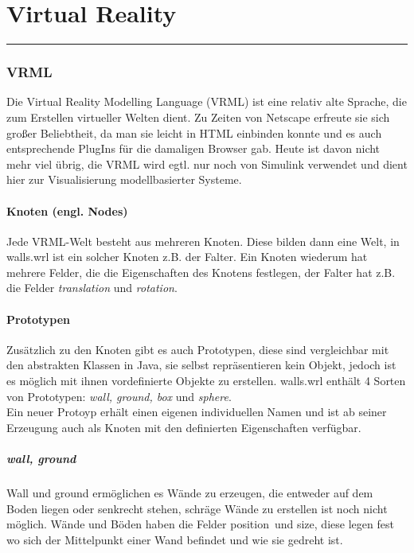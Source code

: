 \documentclass[titlepage, a4paper, ngerman]{article}
\begin{document}
\part{Virtual Reality}
\rule{\linewidth}{0.5mm}
\setcounter{section}{0}
\section{VRML}
\label{vrml}
Die Virtual Reality Modelling Language (VRML) ist eine relativ alte Sprache, die zum Erstellen virtueller Welten dient. Zu Zeiten von Netscape erfreute sie sich großer Beliebtheit, da man sie leicht in HTML einbinden konnte und es auch entsprechende PlugIns für die damaligen Browser gab. Heute ist davon nicht mehr viel übrig, die VRML wird egtl. nur noch von Simulink verwendet und dient hier zur Visualisierung modellbasierter Systeme.

\subsection{Knoten (engl. Nodes)}
\label{nodes}
Jede VRML-Welt besteht aus mehreren Knoten. Diese bilden dann eine Welt, in walls.wrl ist ein solcher Knoten z.B. der Falter. Ein Knoten wiederum hat mehrere Felder, die die Eigenschaften des Knotens festlegen, der Falter hat z.B. die Felder {\em translation} und {\em rotation}.

\subsection{Prototypen}
\label{protos}
Zusätzlich zu den Knoten gibt es auch Prototypen, diese sind vergleichbar mit den abstrakten Klassen in Java, sie selbst repräsentieren kein Objekt, jedoch ist es möglich mit ihnen vordefinierte Objekte zu erstellen. walls.wrl enthält 4 Sorten von Prototypen: {\em wall, ground, box} und {\em sphere}.\\
Ein neuer Protoyp erhält einen eigenen individuellen Namen und ist ab seiner Erzeugung auch als Knoten mit den definierten Eigenschaften verfügbar.

\subsubsection{wall, ground}
Wall und ground ermöglichen es Wände zu erzeugen, die entweder auf dem Boden liegen oder senkrecht stehen, schräge Wände zu erstellen ist noch nicht möglich. Wände und Böden haben die Felder \glqq position\grqq \ und \glqq size\grqq, diese legen fest wo sich der Mittelpunkt einer Wand befindet und wie sie gedreht ist.
\end{document}
